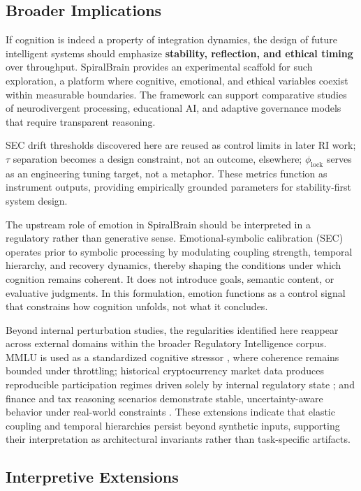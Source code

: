 \documentclass[11pt,a4paper]{article}
\begin{document}
\subsection{Broader Implications}

If cognition is indeed a property of integration dynamics, the design of future intelligent systems should emphasize \textbf{stability, reflection, and ethical timing} over throughput.
SpiralBrain provides an experimental scaffold for such exploration, a platform where cognitive, emotional, and ethical variables coexist within measurable boundaries.
The framework can support comparative studies of neurodivergent processing, educational AI, and adaptive governance models that require transparent reasoning.

SEC drift thresholds discovered here are reused as control limits in later RI work; $\tau$ separation becomes a design constraint, not an outcome, elsewhere; $\phi_{\text{lock}}$ serves as an engineering tuning target, not a metaphor. These metrics function as instrument outputs, providing empirically grounded parameters for stability-first system design.

The upstream role of emotion in SpiralBrain should be interpreted in a regulatory rather than generative sense. Emotional-symbolic calibration (SEC) operates prior to symbolic processing by modulating coupling strength, temporal hierarchy, and recovery dynamics, thereby shaping the conditions under which cognition remains coherent. It does not introduce goals, semantic content, or evaluative judgments. In this formulation, emotion functions as a control signal that constrains how cognition unfolds, not what it concludes.

Beyond internal perturbation studies, the regularities identified here reappear across external domains within the broader Regulatory Intelligence corpus. MMLU is used as a standardized cognitive stressor \cite{mmlu_cognitive_integrity}, where coherence remains bounded under throttling; historical cryptocurrency market data produces reproducible participation regimes driven solely by internal regulatory state \cite{emotion_conditioned_risk_posture}; and finance and tax reasoning scenarios demonstrate stable, uncertainty-aware behavior under real-world constraints \cite{Cragin2026Finance}. These extensions indicate that elastic coupling and temporal hierarchies persist beyond synthetic inputs, supporting their interpretation as architectural invariants rather than task-specific artifacts.

\subsection{Interpretive Extensions}
\end{document}
